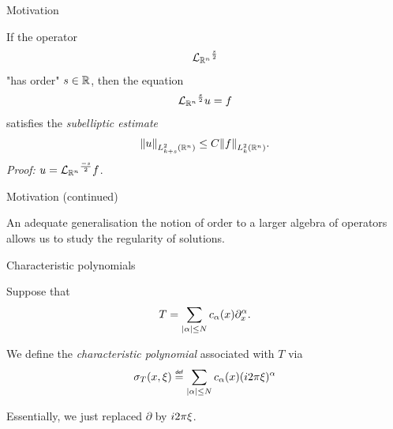 \documentclass{beamer}
\begin{document}
\begin{frame}
    {Motivation}

    If the operator
    \begin{align*}
        {\Laplacian [\R^n]}^\frac s 2
    \end{align*}
    "has order" $s \in \R$,
    \pause
    then the equation
    \begin{align*}
        {\Laplacian [\R^n]}^\frac s 2 u = f
    \end{align*}
    satisfies the \emph{subelliptic estimate}
    \begin{align*}
        \norm [\Sobolev {k + s}] u
        \leq C \norm [\Sobolev k] f.
    \end{align*}
    \pause
    \emph{Proof:} $u = {\Laplacian [\R^n]}^\frac {-s} 2 f$.
\end{frame}

\begin{frame}
    {Motivation (continued)}

    An adequate generalisation the notion of order to a larger algebra of operators allows us to study the regularity of solutions.
\end{frame}

\begin{frame}
    {Characteristic polynomials}

    \begin{definition}
        Suppose that
        \begin{align*}
            T =
            \sum_{\abs \alpha \leq N}
            c_\alpha(x)
            \iD{x^\alpha}.
        \end{align*}

        We define the \emph{characteristic polynomial} 
        associated with $T$ via
        \begin{align*}
            \sigma_T(x, \xi) \defeq
            \sum_{\abs \alpha \leq N}
            c_\alpha(x)
            (\i \turn \xi)^\alpha
        \end{align*}
    \end{definition}

    \pause
    Essentially, we just replaced $\partial$ by $\i \turn \xi$.
\end{frame}
\end{document}
